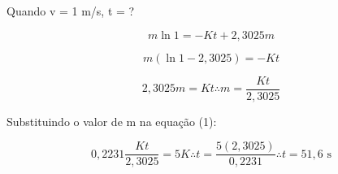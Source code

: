 \documentclass{beamer}
\begin{document}
	\begin{frame}
		Quando v = 1 m/s, t = ? 
		
		\begin{displaymath}
			m\ln 1 = -Kt + 2,3025m
		\end{displaymath} \pause
	
		\begin{displaymath}
			m(\ln 1 - 2,3025) = -Kt
		\end{displaymath} \pause	
		
		\begin{equation}
			2,3025m = Kt \therefore \boxed{ m = \frac{Kt}{2,3025} }
		\end{equation} \pause
		
		Substituindo o valor de m na equação (1):
		
		\begin{displaymath}
			0,2231 \frac{Kt}{2,3025} = 5K \therefore t = \frac{5(2,3025)}{0,2231} \therefore \boxed{ t = 51,6 \text{ s} }
		\end{displaymath}
	
	
	
	
	\end{frame}
	
\end{document}
